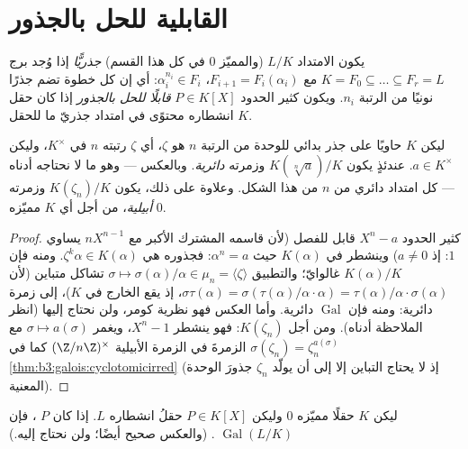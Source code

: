 \section{القابلية للحل بالجذور}

\begin{definition}\label{def:b3:galois:radical}
يكون الامتداد $L/K$ (والمميّز $0$ في كل هذا القسم)
\emph{جذريًّا} إذا وُجد برج $K = F_0 \subseteq \dots
\subseteq F_r = L$ مع $F_{i+1} = F_i(\alpha_i)$، $\alpha_i^{n_i} \in F_i$: أي إن
كل خطوة تضم جذرًا نونيًا من الرتبة $n_i$. ويكون كثير الحدود
$P \in K[X]$ \emph{قابلًا للحل بالجذور} إذا كان حقل انشطاره محتوًى في امتداد جذريّ ما للحقل $K$.
\end{definition}

\begin{lemma}\label{lem:b3:galois:cyclicsteps}
ليكن $K$ حاويًا على جذر بدائي للوحدة من الرتبة $n$ هو $\zeta$،
أي $\zeta$ رتبته $n$ في $K^\times$، وليكن $a \in K^\times$.
عندئذٍ يكون $K(\sqrt[n]a)/K$  وزمرته \emph{دائرية}.
وبالعكس --- وهو ما لا نحتاجه أدناه --- كل امتداد دائري من
 $n$ من هذا الشكل. وعلاوة على ذلك، يكون $K(\zeta_n)/K$
 وزمرته \emph{أبيلية}، من أجل أي $K$ مميّزه $0$.
\end{lemma}

\begin{proof}
كثير الحدود $X^n - a$ قابل للفصل (لأن قاسمه المشترك الأكبر مع
$nX^{n-1}$ يساوي $1$: إذ $a \neq 0$) وينشطر في $K(\alpha)$ حيث
$\alpha^n = a$: فجذوره هي $\zeta^k\alpha \in K(\alpha)$. ومنه فإن $K(\alpha)/K$
غالوايّ؛ والتطبيق $\sigma \mapsto \sigma(\alpha)/\alpha \in \mu_n = \langle
\zeta\rangle$ تشاكل متباين (لأن $\sigma\tau(\alpha) =
\sigma(\tau(\alpha)/\alpha \cdot \alpha) =
\tau(\alpha)/\alpha\cdot\sigma(\alpha)$، إذ يقع
الخارج في $K$)، إلى زمرة دائرية: ومنه فإن $\operatorname{Gal}$ دائرية. وأما
العكس فهو نظرية كومر، ولن نحتاج إليها (انظر الملاحظة أدناه).
ومن أجل $K(\zeta_n)$: فهو ينشطر 
$X^n -
1$، ويغمر $\sigma \mapsto a(\sigma)$ مع $\sigma(\zeta_n) =
\zeta_n^{a(\sigma)}$ الزمرةَ في الزمرة الأبيلية
$(\Z/n\Z)^\times$ كما في \cref{thm:b3:galois:cyclotomicirred} (إذ لا يحتاج التباين إلا إلى أن
يولّد $\zeta_n$ جذورَ الوحدة المعنية).
\end{proof}

\begin{theorem}[غالوا]\label{thm:b3:galois:solvable}
ليكن $K$ حقلًا مميّزه $0$ وليكن $P \in K[X]$ حقلُ انشطاره $L$.
إذا كان $P$ ، فإن $\operatorname{Gal}(L/K)$ .
(والعكس صحيح أيضًا؛ ولن نحتاج إليه.)
\end{theorem}

